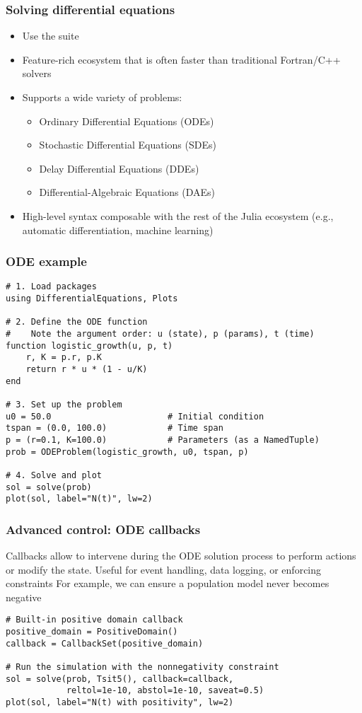 \documentclass[aspectratio=169]{beamer}\usepackage[]{graphicx}\usepackage[]{xcolor}
\begin{document}
\begin{frame}
  \frametitle{Solving differential equations}
  \begin{itemize}
    \item Use the  suite
    \vfill
    \item Feature-rich ecosystem that is often faster than traditional Fortran/C++ solvers
    \vfill
    \item Supports a wide variety of problems:
    \begin{itemize}
        \item Ordinary Differential Equations (ODEs)
        \item Stochastic Differential Equations (SDEs)
        \item Delay Differential Equations (DDEs)
        \item Differential-Algebraic Equations (DAEs)
    \end{itemize}
    \vfill
    \item High-level syntax composable with the rest of the Julia ecosystem (e.g., automatic differentiation, machine learning)
  \end{itemize}
\end{frame}

\begin{frame}[fragile]
  \frametitle{ODE example}
  \begin{lstlisting}
# 1. Load packages
using DifferentialEquations, Plots

# 2. Define the ODE function
#    Note the argument order: u (state), p (params), t (time)
function logistic_growth(u, p, t)
    r, K = p.r, p.K
    return r * u * (1 - u/K)
end

# 3. Set up the problem
u0 = 50.0                       # Initial condition
tspan = (0.0, 100.0)            # Time span
p = (r=0.1, K=100.0)            # Parameters (as a NamedTuple)
prob = ODEProblem(logistic_growth, u0, tspan, p)

# 4. Solve and plot
sol = solve(prob)
plot(sol, label="N(t)", lw=2)\end{lstlisting}
\end{frame}

\begin{frame}[fragile]
  \frametitle{Advanced control: ODE callbacks}
\bbullet Callbacks allow to intervene during the ODE solution process to perform actions or modify the state. Useful for event handling, data logging, or enforcing constraints
\vfill
\bbullet For example, we can ensure a population model never becomes negative
\vfill
\begin{lstlisting}
# Built-in positive domain callback
positive_domain = PositiveDomain()
callback = CallbackSet(positive_domain)

# Run the simulation with the nonnegativity constraint
sol = solve(prob, Tsit5(), callback=callback, 
            reltol=1e-10, abstol=1e-10, saveat=0.5)
plot(sol, label="N(t) with positivity", lw=2)
\end{lstlisting}
\end{frame}
\end{document}
